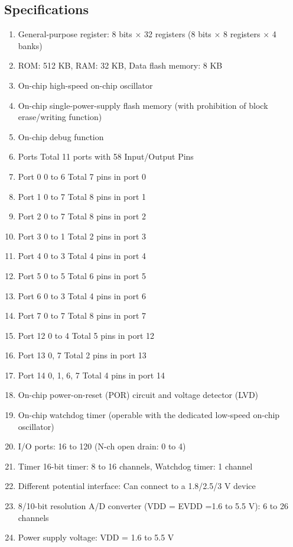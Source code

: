 \documentclass[12pt,a4paper]{report}
\begin{document}
\subsection{Specifications}
\begin{enumerate}
	\item General-purpose register: 8 bits × 32 registers (8 bits × 8 registers × 4 banks)
	\item ROM: 512 KB, RAM: 32 KB, Data flash memory: 8 KB 
	\item On-chip high-speed on-chip oscillator 
	\item On-chip single-power-supply flash memory (with prohibition of block erase/writing function) 
	\item On-chip debug function 
	\item Ports  Total 11 ports with 58 Input/Output Pins
	\item Port 0  0 to 6  Total 7 pins in port 0
	\item Port 1  0 to 7  Total 8 pins in port 1
	\item Port 2  0 to 7  Total 8 pins in port 2
	\item Port 3  0 to 1  Total 2 pins in port 3
	\item Port 4  0 to 3  Total 4 pins in port 4
	\item Port 5  0 to 5  Total 6 pins in port 5
	\item Port 6  0 to 3  Total 4 pins in port 6
	\item Port 7  0 to 7  Total 8 pins in port 7
	\item Port 12  0 to 4  Total 5 pins in port 12
	\item Port 13  0, 7  Total 2 pins in port 13
	\item Port 14  0, 1, 6, 7  Total 4 pins in port 14
	\item On-chip power-on-reset (POR) circuit and voltage detector (LVD)  
	\item On-chip watchdog timer (operable with the dedicated low-speed on-chip oscillator) 
	\item I/O ports: 16 to 120 (N-ch open drain: 0 to 4) 
	\item Timer   16-bit timer:  8 to 16 channels, Watchdog timer:  1 channel 
	\item Different potential interface: Can connect to a 1.8/2.5/3 V device 
	\item 8/10-bit resolution A/D converter (VDD = EVDD =1.6 to 5.5 V): 6 to 26 channels 
	\item Power supply voltage: VDD = 1.6 to 5.5 V
\end{enumerate}
\end{document}
